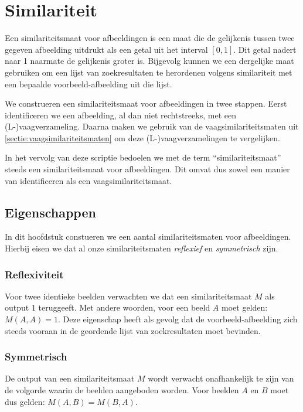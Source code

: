 \chapter{Similariteit}

Een similariteitsmaat voor afbeeldingen is een maat die de gelijkenis tussen twee gegeven
afbeelding uitdrukt als een getal uit het interval $[0,1]$. Dit getal nadert naar 1
naarmate de gelijkenis groter is. Bijgevolg kunnen we een dergelijke maat gebruiken om
een lijst van zoekresultaten te herordenen volgens similariteit met een bepaalde 
voorbeeld-afbeelding uit die lijst. 

We construeren een similariteitsmaat voor afbeeldingen in twee stappen. Eerst identificeren we
een afbeelding, al dan niet rechtstreeks, met een (L-)vaagverzameling. Daarna maken we gebruik van
de vaagsimilariteitsmaten uit \ref{sectie:vaagsimilariteitsmaten} om deze (L-)vaagverzamelingen te
vergelijken. 

In het vervolg van deze scriptie bedoelen we met de term ``similariteitsmaat'' steeds
een similariteitsmaat voor afbeeldingen. Dit omvat dus zowel een manier van identificeren als een 
vaagsimilariteitsmaat.

\section{Eigenschappen}

In dit hoofdstuk constueren we een aantal similariteitsmaten voor afbeeldingen. Hierbij eisen we  
dat al onze similariteitsmaten \emph{reflexief} en \emph{symmetrisch} zijn.

\subsection{Reflexiviteit}

Voor twee identieke beelden verwachten we dat een similariteitsmaat $M$ als output $1$
teruggeeft. Met andere woorden, voor een beeld $A$ moet gelden: $M(A,A)=1$.
Deze eigenschap heeft als gevolg dat de voorbeeld-afbeelding zich steeds vooraan in
de geordende lijst van zoekresultaten moet bevinden.

\subsection{Symmetrisch}

De output van een similariteitsmaat $M$ wordt verwacht onafhankelijk te zijn van de 
volgorde waarin de beelden aangeboden worden. Voor beelden $A$ en $B$ moet dus gelden:
$M(A,B)=M(B,A)$.

